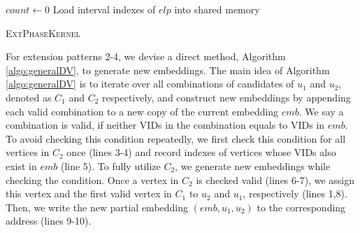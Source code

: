 \begin{algorithm}
$count \leftarrow 0$\;
Load interval indexes of $elp$ into shared memory\;

\caption{\textsc{ExtPhaseKernel}}
\label{algo:extphase}
\end{algorithm}

For extension patterns 2-4, we devise a direct method, Algorithm \ref{algo:generalDV}, to generate new embeddings. The main idea of Algorithm \ref{algo:generalDV} is to iterate over all combinations of candidates of $u_{1}$ and $u_{2}$, denoted as $C_1$ and $C_2$ respectively, and construct new embeddings by appending each valid combination to a new copy of the current embedding $emb$. We say a combination is valid, if neither VIDs in the combination equals to VIDs in $emb$. To avoid checking this condition repeatedly, we first check this condition for all vertices in $C_2$ once (lines 3-4) and record indexes of vertices whose VIDs also exist in $emb$ (line 5). To fully utilize $C_2$, we generate new embeddings while checking the condition. Once a vertex in $C_2$ is checked valid (lines 6-7), we assign this vertex and the first valid vertex in $C_1$ to $u_2$ and $u_1$, respectively (lines 1,8). Then, we write the new partial embedding $(emb,u_1,u_2)$ to the corresponding address (lines 9-10).

